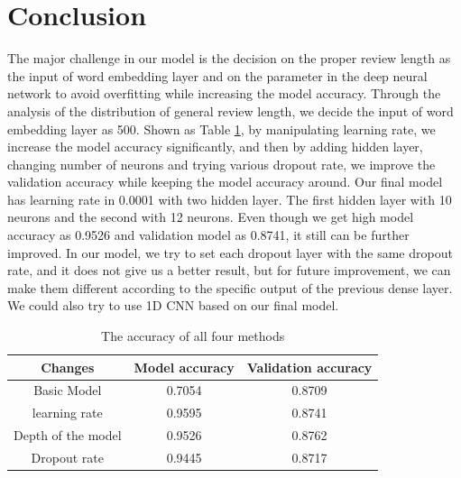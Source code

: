 \documentclass{article}
\begin{document}
\section{Conclusion}
The major challenge in our model is the decision on the proper review length as the input of word embedding layer and on the parameter in the deep neural network to avoid overfitting while increasing the model accuracy. Through the analysis of the distribution of general review length, we decide the input of word embedding layer as 500. Shown as Table \ref{final}, by manipulating learning rate, we increase the model accuracy significantly, and then by adding hidden layer, changing number of neurons and trying various dropout rate, we improve the validation accuracy while keeping the model accuracy around. Our final model has learning rate in 0.0001 with two hidden layer. The first hidden layer with 10 neurons and the second with 12 neurons. Even though we get high model accuracy as 0.9526 and validation model as 0.8741, it still can be further improved. In our model, we try to set each dropout layer with the same dropout rate, and it does not give us a better result, but for future improvement, we can make them different according to the specific output of the previous dense layer. We could also try to use 1D CNN based on our final model. 
\FloatBarrier
\begin{table}[htb]
\centering
\caption{The accuracy of all four methods}
	\begin{tabular}{||c c c||} 
	 \hline
 	Changes & Model accuracy & Validation accuracy\\ [0.5ex] 
 	\hline\hline
 	Basic Model & 0.7054 & 0.8709\\
 	learning rate & 0.9595 & 0.8741 \\ 
 	Depth of the model & 0.9526 & 0.8762\\
   	Dropout rate & 0.9445 & 0.8717\\
   	
 	\hline
	\end{tabular}
\label{final}
\end{table}
\FloatBarrier
\end{document}
